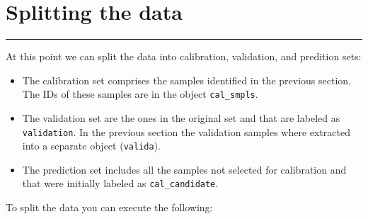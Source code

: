 \documentclass[]{book}
\newenvironment{Shaded}{\begin{snugshade}}{\end{snugshade}}
\newcommand{\DecValTok}[1]{\textcolor[rgb]{0.00,0.00,0.81}{#1}}
\newcommand{\KeywordTok}[1]{\textcolor[rgb]{0.13,0.29,0.53}{\textbf{#1}}}
\newcommand{\NormalTok}[1]{#1}
\newcommand{\OperatorTok}[1]{\textcolor[rgb]{0.81,0.36,0.00}{\textbf{#1}}}
\newcommand{\StringTok}[1]{\textcolor[rgb]{0.31,0.60,0.02}{#1}}
\begin{document}
\hypertarget{splitting-the-data}{%
\chapter{Splitting the data}\label{splitting-the-data}}

\begin{center}\rule{0.5\linewidth}{\linethickness}\end{center}

At this point we can split the data into calibration, validation, and predition sets:

\begin{itemize}
\item
  The calibration set comprises the samples identified in the previous section. The IDs of these samples are in the object \texttt{cal\_smpls}.
\item
  The validation set are the ones in the original set and that are labeled as \texttt{validation}. In the previous section the validation samples where extracted into a separate object (\texttt{valida}).
\item
  The prediction set includes all the samples not selected for calibration and that were initially labeled as \texttt{cal\_candidate}.
\end{itemize}

To split the data you can execute the following:

\begin{Shaded}
\end{Shaded}
\end{document}
